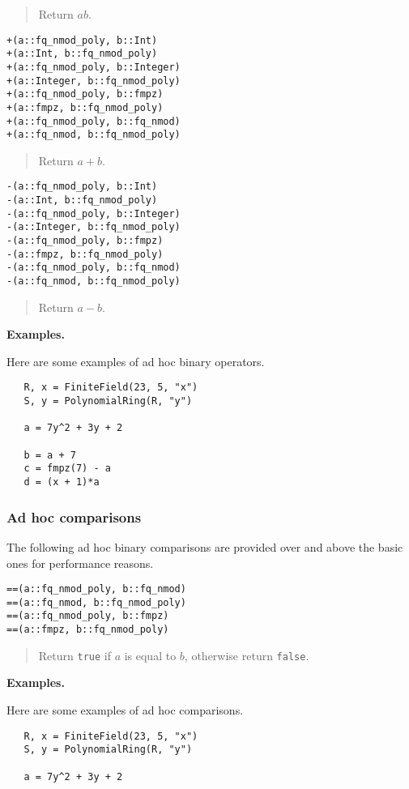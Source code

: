 \documentclass[a4paper,10pt]{article}
\newcommand{\code}{\lstinline}
\newcommand{\desc}[1]{\vspace{-3mm}\begin{quote}#1\end{quote}}
\begin{document}
{{\desc{Return $ab$.}

\begin{lstlisting}
+(a::fq_nmod_poly, b::Int)
+(a::Int, b::fq_nmod_poly)
+(a::fq_nmod_poly, b::Integer)
+(a::Integer, b::fq_nmod_poly)
+(a::fq_nmod_poly, b::fmpz)
+(a::fmpz, b::fq_nmod_poly)
+(a::fq_nmod_poly, b::fq_nmod)
+(a::fq_nmod, b::fq_nmod_poly)
\end{lstlisting}

\desc{Return $a + b$.}

\begin{lstlisting}
-(a::fq_nmod_poly, b::Int)
-(a::Int, b::fq_nmod_poly)
-(a::fq_nmod_poly, b::Integer)
-(a::Integer, b::fq_nmod_poly)
-(a::fq_nmod_poly, b::fmpz)
-(a::fmpz, b::fq_nmod_poly)
-(a::fq_nmod_poly, b::fq_nmod)
-(a::fq_nmod, b::fq_nmod_poly)
\end{lstlisting}

\desc{Return $a - b$.}

\textbf{Examples.}

Here are some examples of ad hoc binary operators.

\begin{lstlisting}
   R, x = FiniteField(23, 5, "x")
   S, y = PolynomialRing(R, "y")

   a = 7y^2 + 3y + 2

   b = a + 7
   c = fmpz(7) - a
   d = (x + 1)*a
\end{lstlisting}

\subsubsection{Ad hoc comparisons}

The following ad hoc binary comparisons are provided over and above the basic ones
for performance reasons.

\begin{lstlisting}
==(a::fq_nmod_poly, b::fq_nmod)
==(a::fq_nmod, b::fq_nmod_poly)
==(a::fq_nmod_poly, b::fmpz)
==(a::fmpz, b::fq_nmod_poly)
\end{lstlisting}

\desc{Return \code{true} if $a$ is equal to $b$, otherwise return \code{false}.}

\textbf{Examples.}

Here are some examples of ad hoc comparisons.

\begin{lstlisting}
   R, x = FiniteField(23, 5, "x")
   S, y = PolynomialRing(R, "y")

   a = 7y^2 + 3y + 2


\end{lstlisting}}}
\end{document}
